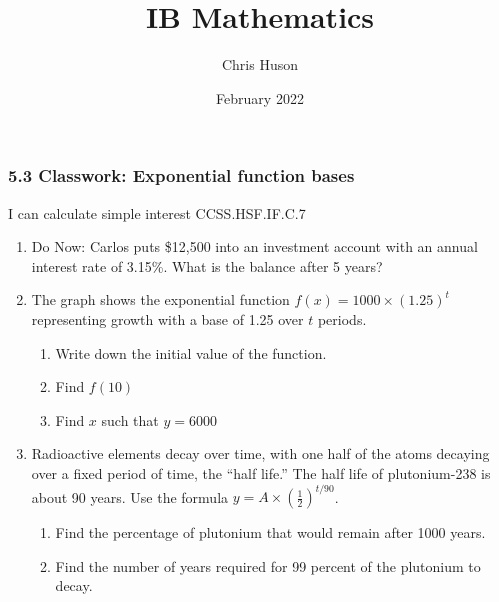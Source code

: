 \documentclass[12pt, twoside]{article}
\title{IB Mathematics}
\author{Chris Huson}
\date{February 2022}
\begin{document}
\subsubsection*{5.3 Classwork: Exponential function bases}
I can calculate simple interest \hfill CCSS.HSF.IF.C.7

\begin{enumerate}
\item Do Now: Carlos puts \$12,500 into an investment account with an annual interest rate of 3.15\%. What is the balance after 5 years? \vspace{2cm}

\item The graph shows the exponential function $\displaystyle f(x)=1000 \times \left( 1.25 \right)^t$ representing growth with a base of 1.25 over $t$ periods.
\begin{multicols}{2}
    \begin{enumerate}[itemsep=1cm]
        \item Write down the initial value of the function.
        \item Find $f(10)$
        \item Find $x$ such that $y=6000$
    \end{enumerate}
    \begin{center}
    \end{center}
    \end{multicols}

\item Radioactive elements decay over time, with one half of the atoms decaying over a fixed period of time, the ``half life.'' The half life of plutonium-238 is about 90 years. Use the formula $\displaystyle y=A \times \left( \frac{1}{2} \right)^{t/90}$. 
\begin{enumerate}[itemsep=1.5cm]
    \item Find the percentage of plutonium that would remain after 1000 years.
    \item Find the number of years required for 99 percent of the plutonium to decay.
\end{enumerate}


\end{enumerate}
\end{document}

